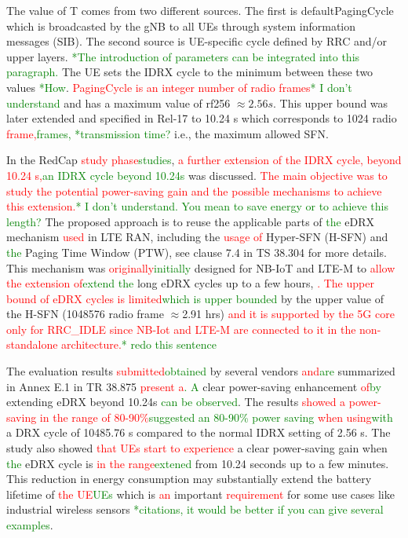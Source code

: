 \documentclass[]{IEEEtran}
\newcommand{\CAREPL}[2]{\textcolor{red}{#1}\textcolor{green}{#2}}
\begin{document}
The value of T comes from two different sources. The first is defaultPagingCycle which is broadcasted by the gNB to all UEs through system information messages (SIB). The second source is UE-specific cycle defined by RRC and/or upper layers. \CAREPL{}{*The introduction of parameters can be integrated into this paragraph. } 
The UE sets the IDRX cycle to the minimum between these two values \CAREPL{}{*How}. \CAREPL{PagingCycle is an integer number of radio frames}{* I don't understand} and has a maximum value of rf256 $\approx2.56 s$. 
This upper bound was later extended and specified in Rel-17 to 10.24 s which corresponds to 1024 radio \CAREPL{frame,}{frames,} \CAREPL{}{*transmission time?} i.e., the maximum allowed SFN.

In the RedCap \CAREPL{study phase}{studies}, \CAREPL{a further extension of the IDRX cycle, beyond 10.24 s,}{an IDRX cycle beyond  10.24s} was discussed. 
\CAREPL{The main objective was to study the potential power-saving gain and the possible mechanisms to achieve this extension.}{* I don't understand. You mean to save energy or to achieve this length?} 
The proposed approach is to reuse the applicable parts of \CAREPL{}{the} eDRX mechanism \CAREPL{used}{} in LTE RAN, including the \CAREPL{usage of}{} Hyper-SFN (H-SFN) and \CAREPL{}{the} Paging Time Window (PTW), see clause 7.4 in TS 38.304 \cite{3gpp_nr_2022-10_38.304} for more details. 
This mechanism was \CAREPL{originally}{initially} designed for NB-IoT and LTE-M to \CAREPL{allow the extension of}{extend the} long eDRX cycles up to a few hours, \CAREPL{. The upper bound of eDRX cycles is limited}{which is upper bounded} by the upper value of the H-SFN (1048576 radio frame $\approx$2.91 hrs) \CAREPL{and it is supported by the 5G core only for RRC\_IDLE since NB-Iot and LTE-M are connected to it in the non-standalone architecture.}{* redo this sentence}

The evaluation results \CAREPL{submitted}{obtained} by several vendors \CAREPL{and}{are} summarized in Annex E.1 in TR 38.875 \cite{3gpp_study_2021_38.875} \CAREPL{present a}{. A} clear power-saving enhancement \CAREPL{of}{by} extending eDRX beyond 10.24s \CAREPL{}{can be observed}. 
The results \CAREPL{showed a power-saving in the range of 80-90$\%$}{suggested an 80-90\% power saving} \CAREPL{when using}{with} a DRX cycle of 10485.76 s compared to the normal IDRX setting of 2.56 s. 
The study also showed \CAREPL{that UEs start to experience}{} a clear power-saving gain when \CAREPL{}{the} eDRX cycle is \CAREPL{in the range}{extened} from 10.24 seconds up to a few minutes. 
This reduction in energy consumption may substantially extend the battery lifetime of \CAREPL{the UE}{UEs} which is \CAREPL{an}{} important \CAREPL{requirement}{} for some use cases like industrial wireless sensors \CAREPL{}{*citations, it would be better if you can give several examples}.
 
\end{document}
